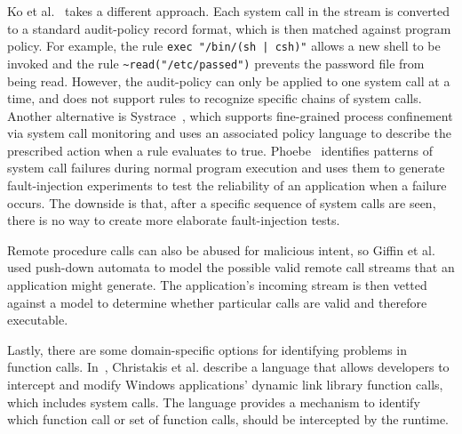 
Ko et al.~\cite{DBLP:conf/acsac/KoFL94} 
takes a different approach.
Each system call in the
stream is converted to a standard audit-policy record format, which is then
matched against program policy. For example,
the rule \lstinline+exec "/bin/(sh | csh)"+ allows a new shell to be invoked and the rule
\lstinline+~read("/etc/passed")+ prevents the password file from being read.
However, the audit-policy can only be applied to
one system call at a time,
and does not support rules to recognize specific chains of system calls.
Another alternative is
Systrace~\cite{DBLP:conf/uss/Provos03},
which
supports fine-grained process confinement
via system call monitoring and uses an associated policy language 
to describe the prescribed action when a rule evaluates to true.
Phoebe~\cite{DBLP:journals/corr/abs-2006-04444}
identifies patterns of system call failures during normal program execution
and uses them to generate fault-injection experiments
to test the reliability of an application when a failure occurs.
The downside is that, after a specific sequence of system calls are seen, there is no way to create more elaborate fault-injection
tests.

Remote procedure calls can also be abused for malicious
intent,
so Giffin et al. ~\cite{DBLP:conf/uss/GiffinJM02} used
push-down automata to model the possible valid
remote call streams that an application might generate.
The application's incoming stream 
is then vetted against a model
to determine whether particular calls are valid and therefore executable.

Lastly, there are some domain-specific options for
identifying problems
in function calls.
In~\cite{DBLP:conf/icse/ChristakisEG017}, Christakis et al. describe a language that allows developers to intercept and modify
Windows applications’ dynamic link library function calls, which includes system
calls. The language provides a mechanism to identify which
function call or set of function calls, should be
intercepted by the runtime.

